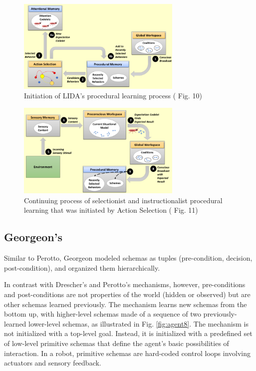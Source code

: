 \documentclass[runningheads]{llncs}
\begin{document}
\begin{figure}
	\centering
	\includegraphics[width=0.7\textwidth]{Figure_LIDA1.png}
	\caption{Initiation of LIDA's procedural learning process (\cite{kugele_learning_2021} Fig. 10)} 
	\label{fig:lida1}
\end{figure}

\begin{figure}
	\centering
	\includegraphics[width=0.7\textwidth]{Figure_LIDA2.png}
	\caption{Continuing process of selectionist and instructionalist procedural learning that was initiated by Action Selection (\cite{kugele_learning_2021} Fig. 11)} 
	\label{fig:lida2}
\end{figure}


\subsection{Georgeon's}

Similar to Perotto, Georgeon modeled schemas as tuples (pre-condition, decision, post-condition), and organized them  hierarchically. 

In contrast with Drescher's and Perotto's mechanisms, however, pre-conditions and post-conditions are not properties of the world (hidden or observed) but are other schemas learned previously. 
The mechanism learns new schemas from the bottom up, with higher-level schemas made of a sequence of two previously-learned lower-level schemas, 
as illustrated in Fig. \ref{fig:agent8}. 
The mechanism is not initialized with a top-level goal. 
Instead, it is initialized with a predefined set of low-level primitive schemas that define the agent's basic possibilities of interaction. 
In a robot, primitive schemas are hard-coded control loops involving actuators and sensory feedback. 
\end{document}

